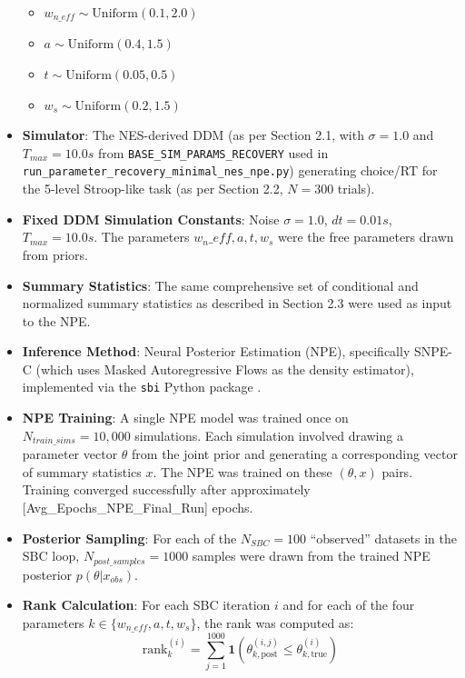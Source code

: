 \documentclass[
  11pt,
]{article}
\providecommand{\tightlist}{%
  \setlength{\itemsep}{0pt}\setlength{\parskip}{0pt}}
\begin{document}
\begin{itemize}
  \begin{itemize}
  \tightlist
  \item
    \(w_{n\_eff} \sim \mathrm{Uniform}(0.1, 2.0)\)
  \item
    \(a \sim \mathrm{Uniform}(0.4, 1.5)\)
  \item
    \(t \sim \mathrm{Uniform}(0.05, 0.5)\)
  \item
    \(w_s \sim \mathrm{Uniform}(0.2, 1.5)\)
  \end{itemize}
\item
  \textbf{Simulator}: The NES-derived DDM (as per Section 2.1, with
  \(\sigma=1.0\) and \(T_{max}=10.0s\) from
  \texttt{BASE\_SIM\_PARAMS\_RECOVERY} used in
  \texttt{run\_parameter\_recovery\_minimal\_nes\_npe.py}) generating
  choice/RT for the 5-level Stroop-like task (as per Section 2.2,
  \(N=300\) trials).
\item
  \textbf{Fixed DDM Simulation Constants}: Noise \(\sigma=1.0\),
  \(dt=0.01s\), \(T_{max}=10.0s\). The parameters
  \(w_n\_eff, a, t, w_s\) were the free parameters drawn from priors.
\item
  \textbf{Summary Statistics}: The same comprehensive set of conditional
  and normalized summary statistics as described in Section 2.3 were
  used as input to the NPE.
\item
  \textbf{Inference Method}: Neural Posterior Estimation (NPE),
  specifically SNPE-C (which uses Masked Autoregressive Flows as the
  density estimator), implemented via the \texttt{sbi} Python package
  \autocite{sbi_package_tejero_etal_2020,sbi_package_cranmer_etal_2020}.
\item
  \textbf{NPE Training}: A single NPE model was trained once on
  \(N_{train\_sims} = 10,000\) simulations. Each simulation involved
  drawing a parameter vector \(\theta\) from the joint prior and
  generating a corresponding vector of summary statistics \(x\). The NPE
  was trained on these \((\theta, x)\) pairs. Training converged
  successfully after approximately {[}Avg\_Epochs\_NPE\_Final\_Run{]}
  epochs.
\item
  \textbf{Posterior Sampling}: For each of the \(N_{SBC}=100\)
  ``observed'' datasets in the SBC loop, \(N_{post\_samples}=1000\)
  samples were drawn from the trained NPE posterior
  \(p(\theta|x_{obs})\).
\item
  \textbf{Rank Calculation}: For each SBC iteration \(i\) and for each
  of the four parameters \(k \in \{w_{n\_eff}, a, t, w_s\}\), the rank
  was computed as: \[
  \mathrm{rank}^{(i)}_k = \sum_{j=1}^{1000} \mathbf{1}\left(\theta_{k,\mathrm{post}}^{(i,j)} \leq \theta_{k,\mathrm{true}}^{(i)}\right)
  \]
\end{itemize}
\end{document}
